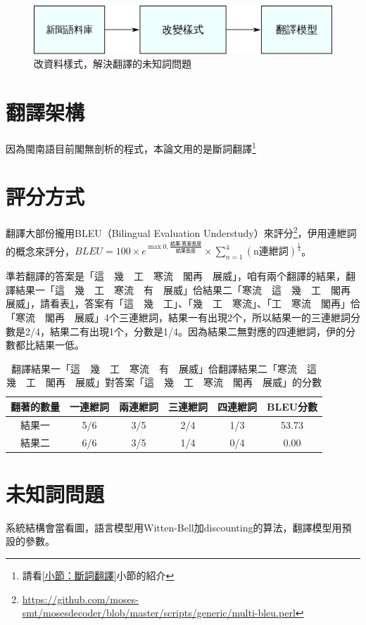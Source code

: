 \documentclass[final,oneside,onecolumn,12pt,a4paper]{book}%
\begin{document}
\begin{figure}
\centerline{\includegraphics[keepaspectratio]{圖/語料格式架構圖}}
\caption{改資料樣式，解決翻譯的未知詞問題}
\label{圖：改語料樣式架構}
\end{figure}
\section{翻譯架構}
\label{節：翻譯架構}
因為閩南語目前閣無剖析的程式，本論文用的是斷詞翻譯\footnote{請看\ref{小節：斷詞翻譯}小節的紹介}
\section{評分方式}
\label{節：評分方式}

翻譯大部份攏用BLEU（Bilingual Evaluation Understudy）來評分\footnote{\url{https://github.com/moses-smt/mosesdecoder/blob/master/scripts/generic/multi-bleu.perl}}，伊用連紲詞的概念來評分，$BLEU=100\times{e^{\max{0,\frac{\textit{結果-答案長度}}{\textit{結果長度}}}}}\times{\sum_{n=1}^{4}(\textrm{n連紲詞})^{\frac{1}{4}}}$。

準若翻譯的答案是「這　幾　工　寒流　閣再　展威」，咱有兩个翻譯的結果，翻譯結果一「這　幾　工　寒流　有　展威」佮結果二「寒流　這　幾　工　閣再　展威」，請看表\ref{表：範例BLEU分數}，答案有「這　幾　工」、「幾　工　寒流」、「工　寒流　閣再」佮「寒流　閣再　展威」4个三連紲詞，結果一有出現2个，所以結果一的三連紲詞分數是2/4，結果二有出現1个，分數是1/4。因為結果二無對應的四連紲詞，伊的分數都比結果一低。

\begin{table}
\caption{翻譯結果一「這　幾　工　寒流　有　展威」佮翻譯結果二「寒流　這　幾　工　閣再　展威」對答案「這　幾　工　寒流　閣再　展威」的分數}%
\label{表：範例BLEU分數}
\centering
\begin{tabular}{|c|cccc|c|}
\hline
翻著的數量 & 一連紲詞 & 兩連紲詞 & 三連紲詞 & 四連紲詞 & BLEU分數\\
\hline
結果一 & 5/6 & 3/5 & 2/4 & 1/3 & 53.73\\
\hline
結果二 & 6/6 & 3/5 & 1/4 & 0/4 & 0.00\\
\hline
\end{tabular}
\end{table}


\section{未知詞問題}
\label{節：未知詞問題}
系統結構會當看圖，語言模型用Witten-Bell加discounting的算法，翻譯模型用預設的參數。
\end{document}
